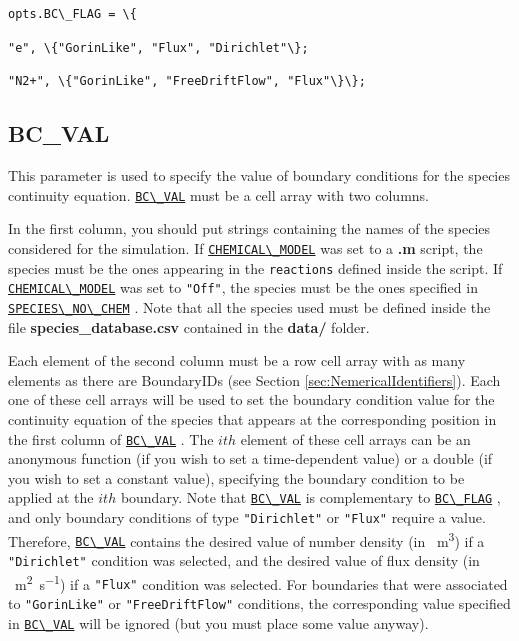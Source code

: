 \documentclass[12pt,a4paper]{article}
\newcommand{\matlabs}[1]{{\lstinline[style=MatlabStyle]!#1!}}
\newcommand{\seclink}[2]{%
	\begingroup
	\hypersetup{linkcolor=orange}%
	\hyperref[sec:#1]{\matlabs{#2}}%
	\endgroup
}
\begin{document}
	\matlabs{opts.BC\_FLAG = \{}
	
	\hspace{40pt} \matlabs{"e", \{"GorinLike", "Flux", "Dirichlet"\};}
	
	\hspace{40pt} \matlabs{"N2+", \{"GorinLike", "FreeDriftFlow", "Flux"\}\};}

	
	\subsection{BC\_VAL}
	\label{sec:bcval}
	This parameter is used to specify the value of boundary conditions for the species continuity equation.
	\seclink{bcval}{BC\_VAL} must be a cell array with two columns.
	
	In the first column, you should put strings containing the names of the species considered for the simulation. If \seclink{chemicalmodel}{CHEMICAL\_MODEL} was set to a \textbf{.m} script, the species must be the ones appearing in the \matlabs{reactions} defined inside the script.
	If \seclink{chemicalmodel}{CHEMICAL\_MODEL} was set to \matlabs{"Off"}, the species must be the ones specified in \seclink{speciesnochem}{SPECIES\_NO\_CHEM}. Note that all the species used must be defined inside the file \textbf{species\_database.csv} contained in the \textbf{data/} folder.

	Each element of the second column must be a row cell array with as many elements as there are BoundaryIDs (see Section \ref{sec:NemericalIdentifiers}). Each one of these cell arrays will be used to set the boundary condition value for the continuity equation of the species that appears at the corresponding position in the first column of \seclink{bcval}{BC\_VAL}. 
	The $ith$ element of these cell arrays can be an anonymous function (if you wish to set a time-dependent value) or a double (if you wish to set a constant value), specifying the boundary condition to be applied at the $ith$ boundary.
	Note that \seclink{bcval}{BC\_VAL} is complementary to \seclink{bcflag}{BC\_FLAG}, and only boundary conditions of type \matlabs{"Dirichlet"} or \matlabs{"Flux"} require a value. Therefore, \seclink{bcval}{BC\_VAL} contains the desired value of number density (in \unit{\per\cubic\meter}) if a \matlabs{"Dirichlet"} condition was selected, and the desired value of flux density (in \unit{\per\square\meter\per\second}) if a \matlabs{"Flux"} condition was selected. For boundaries that were associated to \matlabs{"GorinLike"} or \matlabs{"FreeDriftFlow"} conditions, the corresponding value specified in \seclink{bcval}{BC\_VAL} will be ignored (but you must place some value anyway).
	
\end{document}
